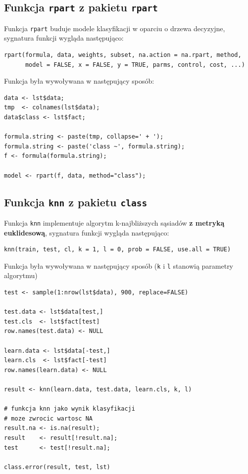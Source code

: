 \documentclass[a4paper,12pt]{article}
\begin{document}
	\subsection{Funkcja \texttt{rpart} z pakietu \texttt{rpart}}
	
	Funkcja \texttt{rpart} buduje modele klasyfikacji w oparciu 
	o drzewa decyzyjne, sygnatura funkcji wygląda następująco:
\begin{verbatim}
rpart(formula, data, weights, subset, na.action = na.rpart, method,
      model = FALSE, x = FALSE, y = TRUE, parms, control, cost, ...)
\end{verbatim}
	
	Funkcja była wywoływana w następujący sposób:
\begin{verbatim}
data <- lst$data;
tmp  <- colnames(lst$data);
data$class <- lst$fact;

formula.string <- paste(tmp, collapse=' + ');
formula.string <- paste('class ~', formula.string);
f <- formula(formula.string);

model <- rpart(f, data, method="class");
\end{verbatim}

	\subsection{Funkcja \texttt{knn} z pakietu \texttt{class}}
	
	Funkcja \texttt{knn} implementuje algorytm k-najbliższych sąsiadów
	\textbf{z metryką euklidesową},
	sygnatura funkcji wygląda następująco:
\begin{verbatim}
knn(train, test, cl, k = 1, l = 0, prob = FALSE, use.all = TRUE)
\end{verbatim}

	Funkcja była wywoływana w następujący sposób (\texttt{k} i 
	\texttt{l} stanowią parametry
	algorytmu)
\begin{verbatim}
test <- sample(1:nrow(lst$data), 900, replace=FALSE)

test.data <- lst$data[test,]
test.cls  <- lst$fact[test]
row.names(test.data) <- NULL

learn.data <- lst$data[-test,]
learn.cls  <- lst$fact[-test]
row.names(learn.data) <- NULL

result <- knn(learn.data, test.data, learn.cls, k, l)

# funkcja knn jako wynik klasyfikacji
# moze zwrocic wartosc NA
result.na <- is.na(result);
result    <- result[!result.na];
test      <- test[!result.na];

class.error(result, test, lst)
\end{verbatim}
\end{document}
